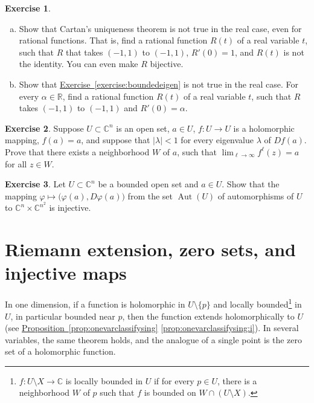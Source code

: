 \documentclass[12pt,openany]{book}
\newcommand{\Aut}{\operatorname{Aut}}
\newcommand{\sabs}[1]{\lvert {#1} \rvert}
\newcommand{\C}{{\mathbb{C}}}
\newcommand{\R}{{\mathbb{R}}}
\theoremstyle{plain}
\theoremstyle{remark}
\theoremstyle{definition}
\newenvironment{exbox}{%
    \def\FrameCommand{\vrule width 1pt \relax\hspace{10pt}}%
    \MakeFramed{\advance\hsize-\width\FrameRestore}%
}{%
    \endMakeFramed
}
\newenvironment{exparts}{%
    \leavevmode\begin{enumerate}[a),noitemsep,topsep=0pt,parsep=0pt,partopsep=0pt]
}{%
    \end{enumerate}
}
\theoremstyle{exercise}
\newtheorem{exercise}{Exercise}[section]
\theoremstyle{example}
\newcommand{\exerciseref}[1]{\hyperref[#1]{Exercise~\ref*{#1}}}
\newcommand{\propref}[1]{\hyperref[#1]{Proposition~\ref*{#1}}}
\begin{document}
\begin{exbox}
\begin{exercise}
\begin{exparts}
\item
Show that Cartan's uniqueness theorem is not true in the real case,
even for rational
functions.  That is, find a rational function $R(t)$ of
a real variable $t$, such that $R$ that takes $(-1,1)$ to
$(-1,1)$, $R'(0) = 1$, and $R(t)$ is not the identity.  You can even make
$R$ bijective.
\item
Show that \exerciseref{exercise:boundedeigen} is not true in the real
case.
For every $\alpha \in \R$, find a rational function $R(t)$ of
a real variable $t$, such that $R$ takes $(-1,1)$ to $(-1,1)$ and
$R'(0) = \alpha$.
\end{exparts}
\end{exercise}

\begin{exercise}
Suppose $U \subset \C^n$ is an open set, $a \in U$,
$f \colon U \to U$ is a holomorphic mapping,
$f(a) = a$, and suppose that $\sabs{\lambda} < 1$
for every eigenvalue $\lambda$ of
$D f(a)$.  Prove that there exists a neighborhood $W$ of $a$, such that
$\lim_{\ell \to \infty} f^{\ell}(z) = a$ for all $z \in W$.
\end{exercise}

\begin{exercise}
Let $U \subset \C^n$ be a bounded open set and $a \in U$.
Show that the mapping $\varphi \mapsto \bigl(\varphi(a),D\varphi(a)\bigr)$
from the set $\Aut(U)$ of automorphisms of $U$ to $\C^n \times \C^{n^2}$
is injective.
\end{exercise}
\end{exbox}


\section{Riemann extension, zero sets, and injective maps}
\label{sec:riemannextzerosetsinjmaps}

In one dimension, if a function is holomorphic in
$U \setminus \{ p \}$ and
locally bounded\footnote{%
$f \colon U \setminus X \to \C$ is locally bounded in $U$
if for every $p \in U$, there is a neighborhood $W$ of
$p$ such that $f$ is bounded on $W \cap (U \setminus X)$.}
in $U$, in particular bounded near
$p$, then the function extends holomorphically to $U$ (see
\propref{prop:onevarclassifysing} \ref{prop:onevarclassifysing:i}).
In several variables,
the same theorem holds, and the analogue of a single point
is the zero set of a holomorphic function.
\end{document}
